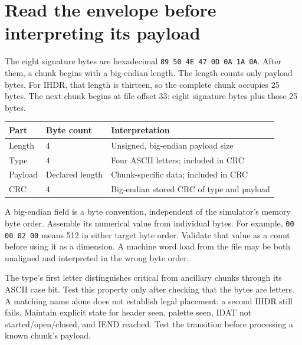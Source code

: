 \section{Read the envelope before interpreting its payload}
The eight signature bytes are hexadecimal \texttt{89 50 4E 47 0D 0A 1A 0A}. After them,
a chunk begins with a big-endian length. The length counts only payload bytes. For
IHDR, that length is thirteen, so the complete chunk occupies 25 bytes. The next
chunk begins at file offset 33: eight signature bytes plus those 25 bytes.

\begin{longtable}{p{24mm}p{35mm}p{91mm}}
\toprule Part & Byte count & Interpretation \\\midrule
Length & 4 & Unsigned, big-endian payload size \\
Type & 4 & Four ASCII letters; included in CRC \\
Payload & Declared length & Chunk-specific data; included in CRC \\
CRC & 4 & Big-endian stored CRC of type and payload \\\bottomrule
\end{longtable}
A big-endian field is a byte convention, independent of the simulator's memory byte
order. Assemble its numerical value from individual bytes. For example,
\texttt{00 00 02 00} means 512 in either target byte order. Validate that value as a
count before using it as a dimension. A machine word load from the file may be both
unaligned and interpreted in the wrong byte order.

The type's first letter distinguishes critical from ancillary chunks through its
ASCII case bit. Test this property only after checking that the bytes are letters.
A matching name alone does not establish legal placement: a second IHDR still fails.
Maintain explicit state for header seen, palette seen, IDAT not started/open/closed,
and IEND reached. Test the transition before processing a known chunk's payload.
